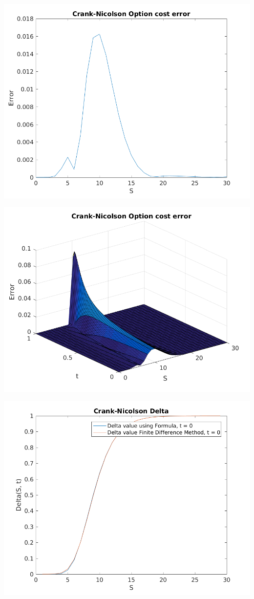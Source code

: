 \documentclass{article}
\begin{document}
\includegraphics{"q1_24"}
\pagebreak


\includegraphics{"q1_25"}
\pagebreak


\includegraphics{"q1_26"}
\pagebreak
\end{document}
